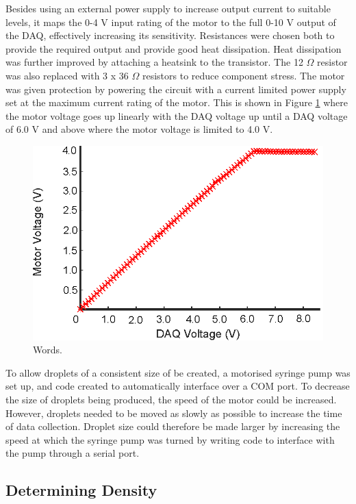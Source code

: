 \documentclass{physics_article_B}
\begin{document}
        Besides using an external power supply to increase output current to suitable levels, it maps the 0-4 V input rating of the motor to the full 0-10 V output of the DAQ, effectively increasing its sensitivity. Resistances were chosen both to provide the required output and provide good heat dissipation. Heat dissipation was further improved by attaching a heatsink to the transistor. The 12 $\Omega$ resistor was also replaced with 3 x 36 $\Omega$ resistors to reduce component stress. The motor was given protection by powering the circuit with a current limited power supply set at the maximum current rating of the motor. This is shown in Figure \ref{fig:MotorCalib} where the motor voltage goes up linearly with the DAQ voltage up until a DAQ voltage of 6.0 V and above where the motor voltage is limited to 4.0 V.
        
\begin{figure}[H]
\centering
\includegraphics{Figures/MotorCalib.eps}
\captionsetup{justification=centering}
\caption{Words.} 	
\label{fig:MotorCalib}
\end{figure} 

        To allow droplets of a consistent size of be created, a motorised syringe pump was set up, and code created to automatically interface over a COM port. To decrease the size of droplets being produced, the speed of the motor could be increased. However, droplets needed to be moved as slowly as possible to increase the time of data collection. Droplet size could therefore be made larger by increasing the speed at which the syringe pump was turned by writing code to interface with the pump through a serial port.
        
        
    \subsection{Determining Density\label{sect:method:density}}
    
\end{document}
